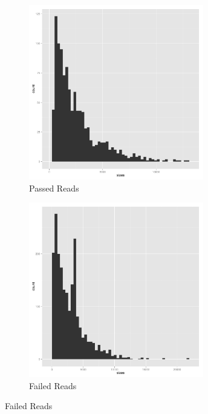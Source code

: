         \begin{figure}[h!]
		\begin{subfigure}[b]{0.45\textwidth}
    			\includegraphics[width=3in]{histallpass}
    			\caption{Passed Reads}
  		\end{subfigure}
  		\begin{subfigure}[b]{0.45\textwidth}
    			\includegraphics[width=3in]{histallfail}
    			\caption{Failed Reads}
  		\end{subfigure}
	\end{figure}
